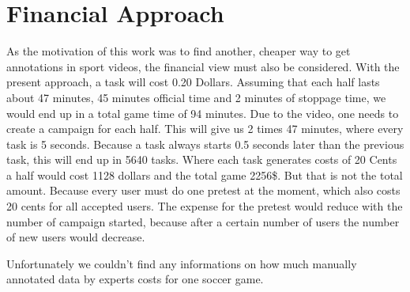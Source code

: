 \section{Financial Approach}

As the motivation of this work was to find another, cheaper way to get annotations in sport videos, the financial view must also be considered.
With the present approach, a task will cost 0.20 Dollars. Assuming that each half lasts about 47 minutes, 45 minutes official time and 2 minutes of stoppage time, we would end up in a total game time of 94 minutes.
Due to the video, one needs to create a campaign for each half. This will give us 2 times 47 minutes, where every task is 5 seconds.
Because a task always starts 0.5 seconds later than the previous task, this will end up in 5640 tasks. Where each task generates costs of 20 Cents a half would cost 1128 dollars and the total game 2256\$.
\newline
But that is not the total amount. Because every user must do one pretest at the moment, which also costs 20 cents for all accepted users.
The expense for the pretest would reduce with the number of campaign started, because after a certain number of users the number of new users would decrease.

Unfortunately we couldn't find any informations on how much manually annotated data by experts costs for one soccer game.

